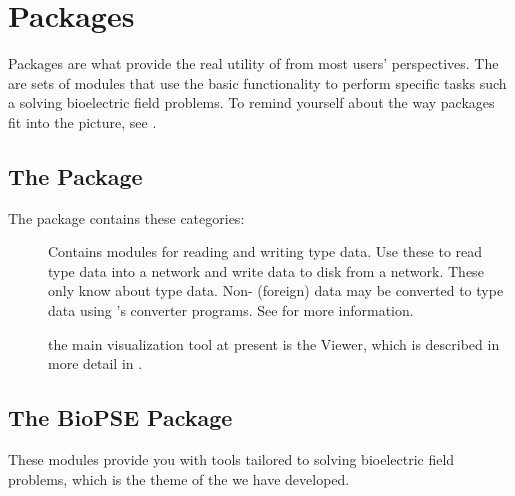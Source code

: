 %
\section{Packages}
\label{sec:packages}

Packages are what provide the real utility of \SR{} from most users'
perspectives.  The are sets of modules that use the basic \SR{}
functionality to perform specific tasks such a solving bioelectric field
problems.  To remind yourself about the way packages fit into the picture,
see .

\subsection{The \sr{} Package}
\label{sec:srpackage}

The \sr{} package contains these categories:

\begin{description}

\item[] Contains modules for reading and writing \sr{}
  type data.  Use these to read \sr{} type data into a network and write
  data to disk from a network.  These only know about \sr{} type data.
  Non-\sr{} (foreign) data may be converted to \sr{} type data using
  \sr{}'s converter programs.  See  for more information.

\item[] \missing{}
\item[] \missing{}
\item[] \missing{}
\item[] the main visualization tool at present is
  the Viewer, which is described in more detail in .
\end{description}

\subsection{The BioPSE Package}
\label{sec:biopsepackage}


These modules provide you with tools tailored to solving bioelectric field
problems, which is the theme of the  we have developed.


\begin{description}
\item[] \missing{}
\item[] \missing{}
\item[] \missing{}
\end{description}

